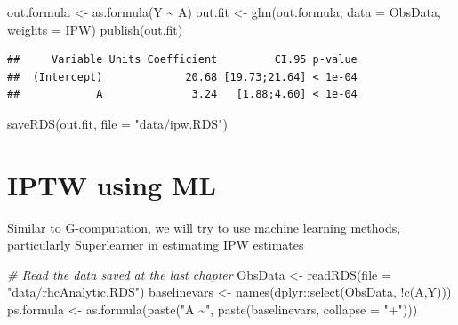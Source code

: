 \documentclass[
]{book}
\newenvironment{Shaded}{\begin{snugshade}}{\end{snugshade}}
\newcommand{\AttributeTok}[1]{\textcolor[rgb]{0.77,0.63,0.00}{#1}}
\newcommand{\CommentTok}[1]{\textcolor[rgb]{0.56,0.35,0.01}{\textit{#1}}}
\newcommand{\FunctionTok}[1]{\textcolor[rgb]{0.00,0.00,0.00}{#1}}
\newcommand{\NormalTok}[1]{#1}
\newcommand{\OtherTok}[1]{\textcolor[rgb]{0.56,0.35,0.01}{#1}}
\newcommand{\SpecialCharTok}[1]{\textcolor[rgb]{0.00,0.00,0.00}{#1}}
\newcommand{\StringTok}[1]{\textcolor[rgb]{0.31,0.60,0.02}{#1}}
\begin{document}
\begin{Shaded}
\begin{Highlighting}[]
\NormalTok{out.formula }\OtherTok{\textless{}{-}} \FunctionTok{as.formula}\NormalTok{(Y }\SpecialCharTok{\textasciitilde{}}\NormalTok{ A)}
\NormalTok{out.fit }\OtherTok{\textless{}{-}} \FunctionTok{glm}\NormalTok{(out.formula,}
               \AttributeTok{data =}\NormalTok{ ObsData,}
               \AttributeTok{weights =}\NormalTok{ IPW)}
\FunctionTok{publish}\NormalTok{(out.fit)}
\end{Highlighting}
\end{Shaded}

\begin{verbatim}
##     Variable Units Coefficient         CI.95 p-value 
##  (Intercept)             20.68 [19.73;21.64] < 1e-04 
##            A              3.24   [1.88;4.60] < 1e-04
\end{verbatim}

\begin{Shaded}
\begin{Highlighting}[]
\FunctionTok{saveRDS}\NormalTok{(out.fit, }\AttributeTok{file =} \StringTok{"data/ipw.RDS"}\NormalTok{)}
\end{Highlighting}
\end{Shaded}

\hypertarget{iptw-using-ml}{%
\chapter{IPTW using ML}\label{iptw-using-ml}}

Similar to G-computation, we will try to use machine learning methods, particularly Superlearner in estimating IPW estimates

\begin{Shaded}
\begin{Highlighting}[]
\CommentTok{\# Read the data saved at the last chapter}
\NormalTok{ObsData }\OtherTok{\textless{}{-}} \FunctionTok{readRDS}\NormalTok{(}\AttributeTok{file =} \StringTok{"data/rhcAnalytic.RDS"}\NormalTok{)}
\NormalTok{baselinevars }\OtherTok{\textless{}{-}} \FunctionTok{names}\NormalTok{(dplyr}\SpecialCharTok{::}\FunctionTok{select}\NormalTok{(ObsData, }\SpecialCharTok{!}\FunctionTok{c}\NormalTok{(A,Y)))}
\NormalTok{ps.formula }\OtherTok{\textless{}{-}} \FunctionTok{as.formula}\NormalTok{(}\FunctionTok{paste}\NormalTok{(}\StringTok{"A \textasciitilde{}"}\NormalTok{,}
                               \FunctionTok{paste}\NormalTok{(baselinevars,}
                                     \AttributeTok{collapse =} \StringTok{"+"}\NormalTok{)))}
\end{Highlighting}
\end{Shaded}
\end{document}
